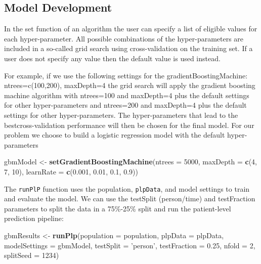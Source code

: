 \documentclass[11pt]{book}
\newenvironment{Shaded}{\begin{snugshade}}{\end{snugshade}}
\newcommand{\DataTypeTok}[1]{\textcolor[rgb]{0.13,0.29,0.53}{#1}}
\newcommand{\DecValTok}[1]{\textcolor[rgb]{0.00,0.00,0.81}{#1}}
\newcommand{\FloatTok}[1]{\textcolor[rgb]{0.00,0.00,0.81}{#1}}
\newcommand{\KeywordTok}[1]{\textcolor[rgb]{0.13,0.29,0.53}{\textbf{#1}}}
\newcommand{\NormalTok}[1]{#1}
\newcommand{\StringTok}[1]{\textcolor[rgb]{0.31,0.60,0.02}{#1}}
\theoremstyle{definition}
\theoremstyle{definition}
\theoremstyle{definition}
\theoremstyle{remark}
\begin{document}
\hypertarget{model-development}{%
\subsection{Model Development}\label{model-development}}

In the set function of an algorithm the user can specify a list of eligible values for each hyper-parameter. All possible combinations of the hyper-parameters are included in a so-called grid search using cross-validation on the training set. If a user does not specify any value then the default value is used instead.

For example, if we use the following settings for the gradientBoostingMachine: ntrees=c(100,200), maxDepth=4 the grid search will apply the gradient boosting machine algorithm with ntrees=100 and maxDepth=4 plus the default settings for other hyper-parameters and ntrees=200 and maxDepth=4 plus the default settings for other hyper-parameters. The hyper-parameters that lead to the bestcross-validation performance will then be chosen for the final model. For our problem we choose to build a logistic regression model with the default hyper-parameters

\begin{Shaded}
\begin{Highlighting}[]
\NormalTok{gbmModel <-}\StringTok{ }\KeywordTok{setGradientBoostingMachine}\NormalTok{(}\DataTypeTok{ntrees =} \DecValTok{5000}\NormalTok{, }\DataTypeTok{maxDepth =} \KeywordTok{c}\NormalTok{(}\DecValTok{4}\NormalTok{, }\DecValTok{7}\NormalTok{, }\DecValTok{10}\NormalTok{), }
    \DataTypeTok{learnRate =} \KeywordTok{c}\NormalTok{(}\FloatTok{0.001}\NormalTok{, }\FloatTok{0.01}\NormalTok{, }\FloatTok{0.1}\NormalTok{, }\FloatTok{0.9}\NormalTok{))}
\end{Highlighting}
\end{Shaded}

The \texttt{runPlP} function uses the population, \texttt{plpData}, and model settings to train and evaluate the model. We can use the testSplit (person/time) and testFraction parameters to split the data in a 75\%-25\% split and run the patient-level prediction pipeline:

\begin{Shaded}
\begin{Highlighting}[]
\NormalTok{gbmResults <-}\StringTok{ }\KeywordTok{runPlp}\NormalTok{(}\DataTypeTok{population =}\NormalTok{ population, }
                     \DataTypeTok{plpData =}\NormalTok{ plpData, }
                     \DataTypeTok{modelSettings =}\NormalTok{ gbmModel, }
                     \DataTypeTok{testSplit =} \StringTok{'person'}\NormalTok{,}
                     \DataTypeTok{testFraction =} \FloatTok{0.25}\NormalTok{, }
                     \DataTypeTok{nfold =} \DecValTok{2}\NormalTok{, }
                     \DataTypeTok{splitSeed =} \DecValTok{1234}\NormalTok{)}
\end{Highlighting}
\end{Shaded}
\end{document}
